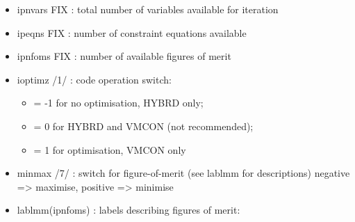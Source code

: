 \documentclass[]{article}
\providecommand{\tightlist}{%
  \setlength{\itemsep}{0pt}\setlength{\parskip}{0pt}}
\begin{document}
\begin{itemize}
\tightlist
\item
  ipnvars FIX : total number of variables available for iteration
\item
  ipeqns FIX : number of constraint equations available
\item
  ipnfoms FIX : number of available figures of merit
\item
  ioptimz /1/ : code operation switch:

  \begin{itemize}
  \tightlist
  \item
    = -1 for no optimisation, HYBRD only;
  \item
    = 0 for HYBRD and VMCON (not recommended);
  \item
    = 1 for optimisation, VMCON only
  \end{itemize}
\item
  minmax /7/ : switch for figure-of-merit (see lablmm for descriptions)
  negative =\textgreater{} maximise, positive =\textgreater{} minimise
\item
  lablmm(ipnfoms) : labels describing figures of merit:


\end{itemize}
\end{document}
